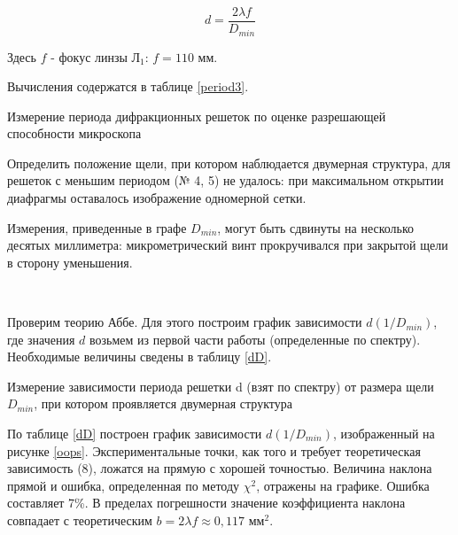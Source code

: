 \documentclass[12pt]{kiarticle}
\begin{document}
	\[ d = \frac{2\lambda f}{D_{min}} \]
	
	Здесь $f$ - фокус линзы $\text{Л}_1$: $f = 110$ мм.  
	
	Вычисления содержатся в таблице \ref{period3}. 
	
	\begin{table}[h]
		\centering
		
		\caption{Измерение периода дифракционных решеток по оценке разрешающей способности микроскопа}
		\label{period3}
	\end{table}	
	
	Определить положение щели, при котором наблюдается двумерная структура, для решеток с меньшим периодом (№ 4, 5) не удалось: при максимальном открытии диафрагмы оставалось изображение одномерной сетки. 
	
	Измерения, приведенные в графе $D_{min}$, могут быть сдвинуты на несколько десятых миллиметра: микрометрический винт прокручивался при закрытой щели в сторону уменьшения.
	
	\
		
	Проверим теорию Аббе. Для этого построим график зависимости $d(1/D_{min})$, где значения $d$ возьмем из первой части работы (определенные по спектру). Необходимые величины сведены в таблицу \ref{dD}. 
	
	\begin{table}[h]
		\centering
		
		\caption{Измерение зависимости периода решетки d (взят по спектру) от размера щели $D_{min}$, при котором проявляется двумерная структура}
		\label{dD}
	\end{table}	
	
	По таблице \ref{dD} построен график зависимости $d(1/D_{min})$, изображенный на рисунке \ref{oops}. Экспериментальные точки, как того и требует теоретическая зависимость (8), ложатся на прямую с хорошей точностью. Величина наклона прямой и ошибка, определенная по методу $\chi^2$, отражены на графике. Ошибка составляет 7\%. В пределах погрешности значение коэффициента наклона совпадает с теоретическим $b = 2\lambda f \approx 0,117 \text{ мм}^2$.
	
\end{document}

